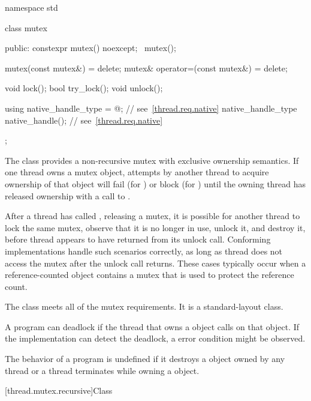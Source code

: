 %
\begin{codeblock}
namespace std {
  class mutex {
  public:
    constexpr mutex() noexcept;
    ~mutex();

    mutex(const mutex&) = delete;
    mutex& operator=(const mutex&) = delete;

    void lock();
    bool try_lock();
    void unlock();

    using native_handle_type = @\impdefnc@;          // see~\ref{thread.req.native}
    native_handle_type native_handle();                         // see~\ref{thread.req.native}
  };
}
\end{codeblock}

\pnum
{}%
The class  provides a non-recursive mutex with exclusive ownership
semantics. If one thread owns a mutex object, attempts by another thread to acquire
ownership of that object will fail (for ) or block (for
) until the owning thread has released ownership with a call to
.

\pnum
\begin{note}
After a thread  has called , releasing a mutex, it is possible for another
thread  to lock the same mutex, observe that it is no longer in use, unlock it, and
destroy it, before thread  appears to have returned from its unlock call. Conforming implementations
handle such scenarios correctly, as long as thread  does not access the
mutex after the unlock call returns. These cases typically occur when a reference-counted object
contains a mutex that is used to protect the reference count.
\end{note}

\pnum
The class  meets
all of the mutex requirements.
It is a standard-layout class.

\pnum
\begin{note}
A program can deadlock if the thread that owns a  object calls
 on that object. If the implementation can detect the deadlock,
a  error condition might be observed.
\end{note}

\pnum
The behavior of a program is undefined if
it destroys a  object owned by any thread or
a thread terminates while owning a  object.

[thread.mutex.recursive]{Class }

